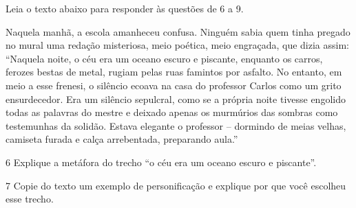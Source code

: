 





Leia o texto abaixo para responder às questões de 6 a 9.

\begin{myquote}

Naquela manhã, a escola amanheceu confusa. Ninguém sabia quem tinha pregado no
mural uma redação misteriosa, meio poética, meio engraçada, que dizia assim:
``Naquela noite, o céu era um oceano escuro e piscante, enquanto os carros, 
ferozes bestas de metal, rugiam pelas ruas famintos por asfalto. No entanto, 
em meio a esse frenesi, o silêncio ecoava na casa do professor Carlos como 
um grito ensurdecedor. Era um silêncio sepulcral, como se a própria noite 
tivesse engolido todas as palavras do mestre e deixado apenas os murmúrios 
das sombras como testemunhas da solidão. Estava elegante o professor -- 
dormindo de meias velhas, camiseta furada e calça arrebentada, preparando aula.''


\end{myquote}

\num{6} Explique a metáfora do trecho ``o céu era um oceano escuro e piscante''.


\num{7} Copie do texto um exemplo de personificação e explique por que você
escolheu esse trecho.


